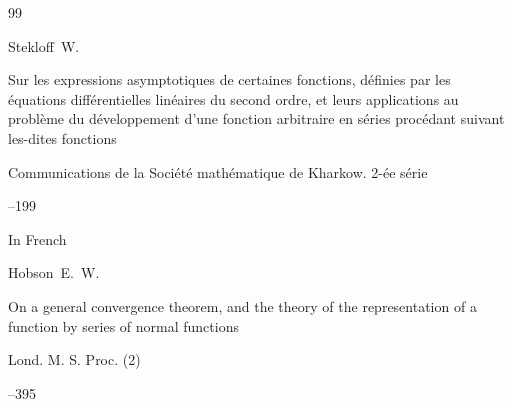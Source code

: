 \newpage



\makeentitle












\begin{thebibliography}{99}




\by Stekloff~W.

\paper Sur les expressions asymptotiques de certaines fonctions, d\'efinies par les \'equations diff\'erentielles lin\'eaires du second ordre, et leurs applications au probl\`eme du d\'eveloppement d'une fonction arbitraire en s\'eries proc\'edant suivant les-dites fonctions

\jour Communications de la Soci\'et\'e math\'ematique de Kharkow. 2-\'ee s\'erie



--199


\lang In French 




\by Hobson~E.~W.

\paper On a general convergence theorem, and the theory of the representation of a function by series of normal functions

\jour Lond. M. S. Proc. \rm (2) 




--395












\end{thebibliography}
